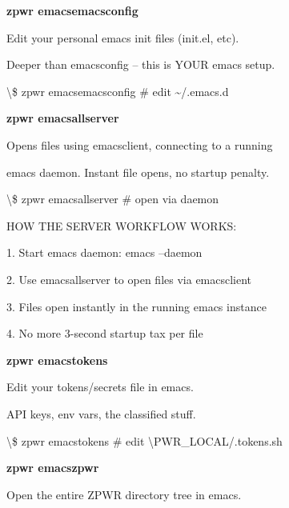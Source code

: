 \documentclass[11pt,a4paper,twoside]{book}
\begin{document}
\vspace{12pt}
{\bfseries\color{neonyellow} zpwr emacsemacsconfig}\vspace{4pt}

Edit your personal emacs init files (init.el, etc).

Deeper than emacsconfig -- this is YOUR emacs setup.

\begin{codebox}
\textbackslash{}\$ zpwr emacsemacsconfig       \# edit \textasciitilde{}/.emacs.d\\
\end{codebox}


\vspace{12pt}
{\bfseries\color{neonyellow} zpwr emacsallserver}\vspace{4pt}

Opens files using emacsclient, connecting to a running

emacs daemon. Instant file opens, no startup penalty.

\begin{codebox}
\textbackslash{}\$ zpwr emacsallserver         \# open via daemon\\
\end{codebox}

HOW THE SERVER WORKFLOW WORKS:

1. Start emacs daemon:  emacs --daemon

2. Use emacsallserver to open files via emacsclient

3. Files open instantly in the running emacs instance

4. No more 3-second startup tax per file


\vspace{12pt}
{\bfseries\color{neonyellow} zpwr emacstokens}\vspace{4pt}

Edit your tokens/secrets file in emacs.

API keys, env vars, the classified stuff.

\begin{codebox}
\textbackslash{}\$ zpwr emacstokens            \# edit \textbackslash{}PWR\_LOCAL/.tokens.sh\\
\end{codebox}


\vspace{12pt}
{\bfseries\color{neonyellow} zpwr emacszpwr}\vspace{4pt}

Open the entire ZPWR directory tree in emacs.
\end{document}
